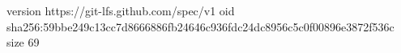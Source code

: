version https://git-lfs.github.com/spec/v1
oid sha256:59bbe249c13cc7d8666886fb24646c936fdc24dc8956c5c0f00896e3872f536c
size 69

